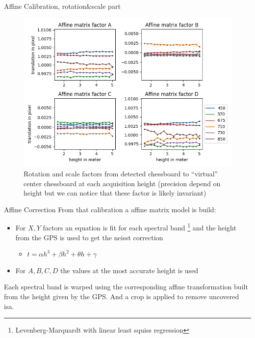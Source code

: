 \documentclass{beamer}
\begin{document}
		\begin{frame}{Affine Calibration, rotation\&scale part}
			\begin{figure}
				\includegraphics[width=0.7\linewidth]{../figures/affine-rotation-height.png}
				\caption{Rotation and scale factors from detected chessboard to ``virtual'' center chessboard at each acquisition height (precision depend on height but we can notice that these factor is likely invariant)}
			\end{figure}
		\end{frame}
	
		\begin{frame}{Affine Correction}
			From that calibration a affine matrix model is build:
			
			\begin{itemize}
				\item For $X,Y$ factors an equation is fit for each spectral band \footnote{Levenberg-Marquardt with linear least squiss regression} and the height from the GPS is used to get the neisst correction
				\begin{itemize}
					\item $t = \alpha h^3 + \beta h^2 + \theta h + \gamma$
				\end{itemize}
				\item For $A,B,C,D$ the values at the most accurate height is used
			\end{itemize}
		
			Each spectral band is warped using the corresponding affine transformation built from the height given by the GPS.
			And a crop is applied to remove uncovered isa.
		\end{frame}
	
\end{document}
